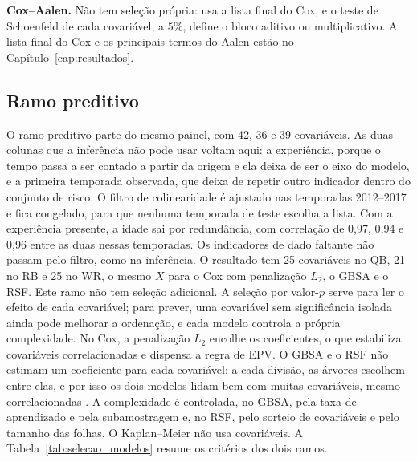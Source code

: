 \textbf{Cox--Aalen.} Não tem seleção própria: usa a lista final do Cox, e o teste de Schoenfeld de cada covariável, a $5\%$, define o bloco aditivo ou multiplicativo. A lista final do Cox e os principais termos do Aalen estão no Capítulo~\ref{cap:resultados}.

\subsection{Ramo preditivo}
\label{sec:prep_predicao}

O ramo preditivo parte do mesmo painel, com 42, 36 e 39 covariáveis. As duas colunas que a inferência não pode usar voltam aqui: a experiência, porque o tempo passa a ser contado a partir da origem e ela deixa de ser o eixo do modelo, e a primeira temporada observada, que deixa de repetir outro indicador dentro do conjunto de risco. O filtro de colinearidade é ajustado nas temporadas 2012--2017 e fica congelado, para que nenhuma temporada de teste escolha a lista. Com a experiência presente, a idade sai por redundância, com correlação de 0,97, 0,94 e 0,96 entre as duas nessas temporadas. Os indicadores de dado faltante não passam pelo filtro, como na inferência. O resultado tem 25 covariáveis no QB, 21 no RB e 25 no WR, o mesmo $X$ para o Cox com penalização $L_2$, o GBSA e o RSF. Este ramo não tem seleção adicional. A seleção por valor-$p$ serve para ler o efeito de cada covariável; para prever, uma covariável sem significância isolada ainda pode melhorar a ordenação, e cada modelo controla a própria complexidade. No Cox, a penalização $L_2$ encolhe os coeficientes, o que estabiliza covariáveis correlacionadas e dispensa a regra de EPV. O GBSA e o RSF não estimam um coeficiente para cada covariável: a cada divisão, as árvores escolhem entre elas, e por isso os dois modelos lidam bem com muitas covariáveis, mesmo correlacionadas \citep{friedman2001,breiman2001}. A complexidade é controlada, no GBSA, pela taxa de aprendizado e pela subamostragem e, no RSF, pelo sorteio de covariáveis e pelo tamanho das folhas. O Kaplan--Meier não usa covariáveis. A Tabela~\ref{tab:selecao_modelos} resume os critérios dos dois ramos.

